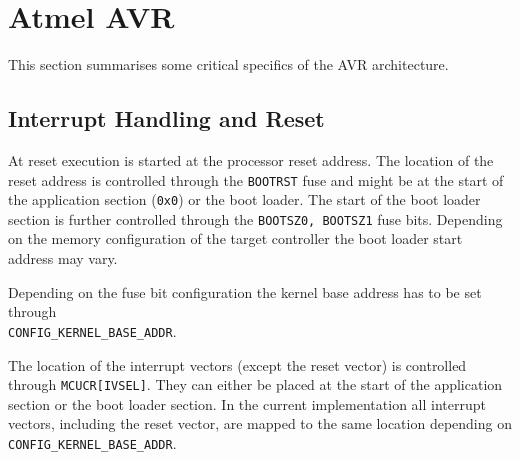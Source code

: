 \section{Atmel AVR}
	This section summarises some critical specifics of the AVR architecture.

	\subsection{Interrupt Handling and Reset}
		At reset execution is started at the processor reset address. The location of the reset address is controlled through the \lstinline{BOOTRST} fuse and might be at the start of the application section (\lstinline{0x0}) or the boot loader. The start of the boot loader section is further controlled through the \lstinline{BOOTSZ0, BOOTSZ1} fuse bits. Depending on the memory configuration of the target controller the boot loader start address may vary.
		
		Depending on the fuse bit configuration the kernel base address has to be set through\\\lstinline{CONFIG_KERNEL_BASE_ADDR}. 

		The location of the interrupt vectors (except the reset vector) is controlled through \lstinline{MCUCR[IVSEL]}. They can either be placed at the start of the application section or the boot loader section. In the current implementation all interrupt vectors, including the reset vector, are mapped to the same location depending on \lstinline{CONFIG_KERNEL_BASE_ADDR}.
